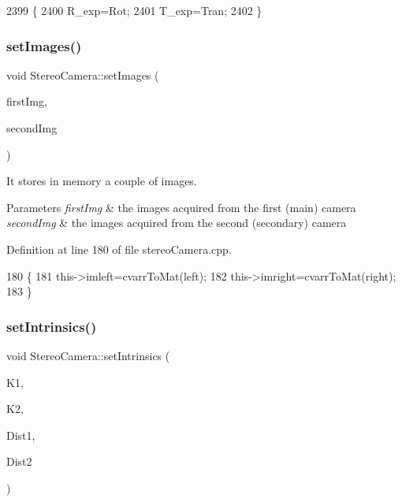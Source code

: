 \begin{DoxyCode}
2399 \{
2400     R\_exp=Rot;
2401     T\_exp=Tran;
2402 \}
\end{DoxyCode}
\mbox{\label{classStereoCamera_a5e24f7d17a11adb4a6310df7f7e2de5b}} 
\subsubsection{\texorpdfstring{set\+Images()}{setImages()}}
{\footnotesize\ttfamily void Stereo\+Camera\+::set\+Images (\begin{DoxyParamCaption}\item[{Ipl\+Image $\ast$}]{first\+Img,  }\item[{Ipl\+Image $\ast$}]{second\+Img }\end{DoxyParamCaption})}



It stores in memory a couple of images. 


\begin{DoxyParams}{Parameters}
{\em first\+Img} & the images acquired from the first (main) camera \\
\hline
{\em second\+Img} & the images acquired from the second (secondary) camera \\
\hline
\end{DoxyParams}


Definition at line 180 of file stereo\+Camera.\+cpp.


\begin{DoxyCode}
180                                                               \{
181     this->imleft=cvarrToMat(left);
182     this->imright=cvarrToMat(right);
183 \}
\end{DoxyCode}
\mbox{\label{classStereoCamera_a54754623497c8dddb61f520e17f465f8}} 
\subsubsection{\texorpdfstring{set\+Intrinsics()}{setIntrinsics()}}
{\footnotesize\ttfamily void Stereo\+Camera\+::set\+Intrinsics (\begin{DoxyParamCaption}\item[{Mat \&}]{K1,  }\item[{Mat \&}]{K2,  }\item[{Mat \&}]{Dist1,  }\item[{Mat \&}]{Dist2 }\end{DoxyParamCaption})}



